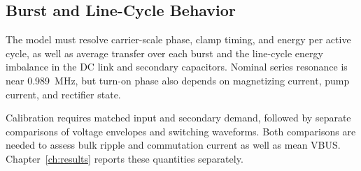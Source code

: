 \subsection{Burst and Line-Cycle Behavior}
\label{sec:sim-steady}

The model must resolve carrier-scale phase, clamp timing, and energy per active cycle, as well as average transfer over each burst and the line-cycle energy imbalance in the DC link and secondary capacitors. Nominal series resonance is near \SI{0.989}{\mega\hertz}, but turn-on phase also depends on magnetizing current, pump current, and rectifier state.

Calibration requires matched input and secondary demand, followed by separate comparisons of voltage envelopes and switching waveforms. Both comparisons are needed to assess bulk ripple and commutation current as well as mean VBUS. Chapter~\ref{ch:results} reports these quantities separately.
